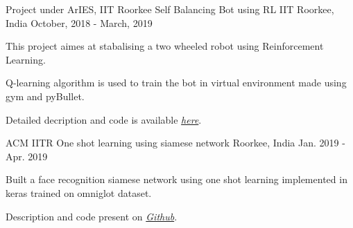 

\begin{cventries}

  \cventry
    {Project under ArIES, IIT Roorkee} %
    {Self Balancing Bot using RL} %
    {IIT Roorkee, India} %
    {October, 2018 - March, 2019} %
    {
      \begin{cvitems} %
        \item {This project aimes at stabalising a two wheeled robot using Reinforcement Learning. }
        \item {Q-learning algorithm is used to train the bot in virtual environment made using gym and pyBullet.}
        \item {Detailed decription and code is available  \emph{\href{https://github.com/GopiKishan14/Self_Balancing_Bot}{here}}.}
      \end{cvitems}
    }

  \cventry
    {ACM IITR} %
    {One shot learning using siamese network} %
    {Roorkee, India} %
    {Jan. 2019 - Apr. 2019} %
    {
      \begin{cvitems} %
        \item {Built a face recognition siamese network using one shot learning implemented in keras trained on omniglot dataset.}
        \item{Description and code present on  
        \emph{\href{https://github.com/GopiKishan14/one_shot_siamese}{Github}}.}
      \end{cvitems}
    }


\end{cventries}
